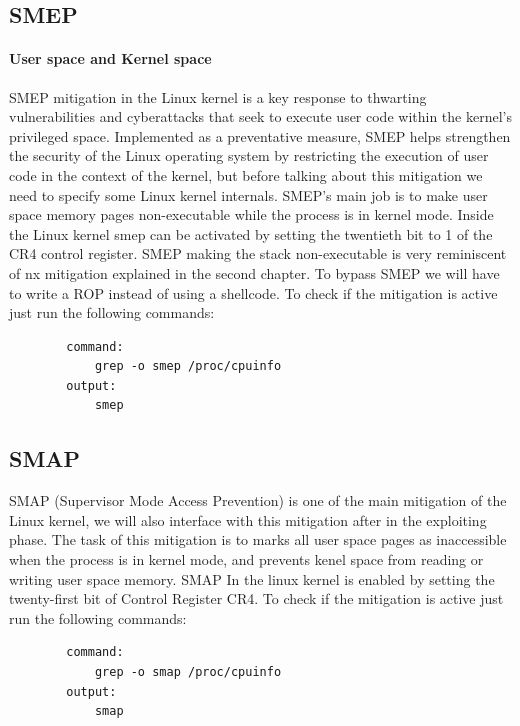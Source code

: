     \subsection{SMEP}

    \paragraph{User space and Kernel space}

   SMEP mitigation in the Linux kernel is a key response to thwarting vulnerabilities and cyberattacks that seek to execute user code within the kernel's privileged space. Implemented as a preventative measure, SMEP helps strengthen the security of the Linux operating system by restricting the execution of user code in the context of the kernel, but before talking about this mitigation we need to specify some Linux kernel internals.\newline
    SMEP's main job is to make user space memory pages non-executable while the process is in kernel mode. Inside the Linux kernel smep can be activated by setting the twentieth bit to 1 of the CR4 control register.\newline
    SMEP making the stack non-executable is very reminiscent of nx mitigation explained in the second chapter.\newline
    To bypass SMEP we will have to write a ROP instead of using a shellcode.\newline 
    To check if the mitigation is active just run the following commands: \newline
        \begin{verbatim}
        command:
            grep -o smep /proc/cpuinfo
        output: 
            smep
    \end{verbatim}
    \subsection{SMAP}
    SMAP (Supervisor Mode Access Prevention) is one of the main mitigation of the Linux kernel, we will also interface with this mitigation after in the exploiting phase.\newline
    The task of this mitigation is to marks all user space pages as inaccessible when the process is in kernel mode, and prevents kenel space from reading or writing user space memory.\newline
    SMAP In the linux kernel is enabled by setting the twenty-first bit of Control Register CR4.\newline
    To check if the mitigation is active just run the following commands: \newline
      \begin{verbatim}
        command:
            grep -o smap /proc/cpuinfo
        output: 
            smap
    \end{verbatim}
